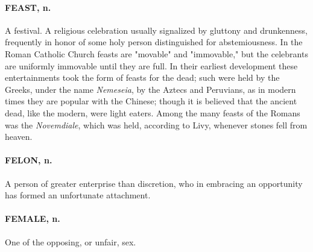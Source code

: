 \documentclass[11pt]{article}
\begin{document}
\paragraph{FEAST, n.}  A festival.  A religious celebration usually signalized by
gluttony and drunkenness, frequently in honor of some holy person
distinguished for abstemiousness.  In the Roman Catholic Church
feasts are "movable" and "immovable," but the celebrants are uniformly
immovable until they are full.  In their earliest development these
entertainments took the form of feasts for the dead; such were held by
the Greeks, under the name {\em Nemeseia}, by the Aztecs and Peruvians,
as in modern times they are popular with the Chinese; though it is
believed that the ancient dead, like the modern, were light eaters.
Among the many feasts of the Romans was the {\em Novemdiale}, which was
held, according to Livy, whenever stones fell from heaven.

\paragraph{FELON, n.}  A person of greater enterprise than discretion, who in
embracing an opportunity has formed an unfortunate attachment.

\paragraph{FEMALE, n.}  One of the opposing, or unfair, sex.
\end{document}
